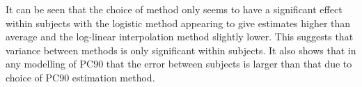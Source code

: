 It can be seen that the choice of method only seems to have a significant effect within subjects with the logistic method appearing to give estimates higher than average and the log-linear interpolation method slightly lower. This suggests that variance between methods is only significant within subjects. It also shows that in any modelling of PC90 that the error between subjects is larger than that due to choice of PC90 estimation method.

\newpage
